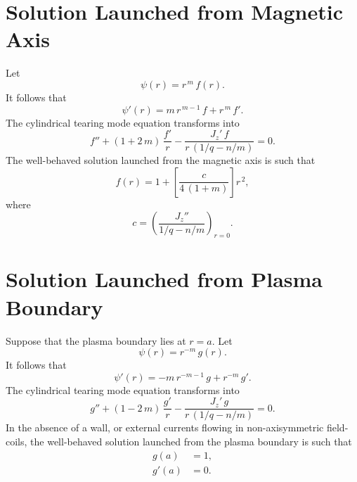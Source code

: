 \documentclass[notitlepage,12pt]{article}
\begin{document}
\section{Solution Launched from Magnetic Axis}
Let
\begin{equation}
\psi(r) = r^{\,m}\,f(r).
\end{equation}
It follows that
\begin{equation}
\psi'(r) = m\,r^{\,m-1}\,f + r^{\,m}\,f'.
\end{equation}
The cylindrical tearing mode equation transforms into
\begin{equation}
f'' + (1+2\,m)\,\frac{f'}{r} - \frac{J_z'\,f}{r\,(1/q-n/m)} = 0.
\end{equation}
The well-behaved solution launched from the magnetic axis is such that
\begin{equation}
f(r) = 1 +\left[\frac{c}{4\,(1+m)}\right]r^{\,2},
\end{equation}
where 
\begin{equation}
c = \left(\frac{J_z''}{1/q-n/m}\right)_{r=0}.
\end{equation}

\section{Solution Launched from Plasma Boundary}
Suppose that the plasma boundary lies at $r=a$. 
Let
\begin{equation}
\psi(r) = r^{-m}\,g(r).
\end{equation}
It follows that
\begin{equation}
\psi'(r) = -m\,r^{-m-1}\,g+ r^{-m}\,g'.
\end{equation}
The cylindrical tearing mode equation transforms into
\begin{equation}
g'' + (1-2\,m)\,\frac{g'}{r} - \frac{J_z'\,g}{r\,(1/q-n/m)} = 0.
\end{equation}
In the absence of a wall, or external currents flowing in non-axisymmetric field-coils, the well-behaved solution launched from the plasma boundary is such that
\begin{align}
g(a) &= 1,\\[0.5ex]
g'(a) &= 0.
\end{align}
\end{document}
